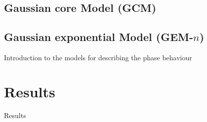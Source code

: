 \documentclass{beamer}
\begin{document}
\subsection{Gaussian core Model (GCM) }
\subsection{Gaussian exponential Model (GEM-$n$)}

\begin{frame}{Introduction to the models for describing the phase behaviour}
	
\end{frame}

\section{Results}
\begin{frame}{Results}
	
\end{frame}
\end{document}

